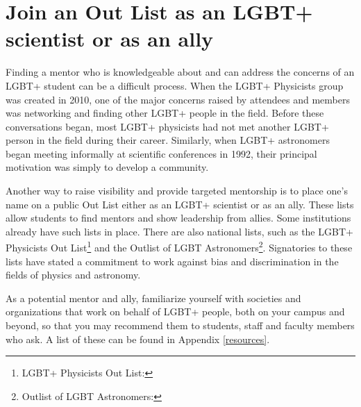 \section {Join an Out List as an LGBT+ scientist or as an ally}
\label{outlist}
Finding a mentor who is knowledgeable about and can address the concerns of an LGBT+ student can be a difficult process. When the LGBT+ Physicists group was created in 2010, one of the major concerns raised by attendees and members was networking and finding other LGBT+ people in the field. Before these conversations began, most LGBT+ physicists had not met another LGBT+ person in the field during their career.  Similarly, when LGBT+ astronomers began meeting informally at scientific conferences in 1992, their principal motivation was simply to develop a community.

Another way to raise visibility and provide targeted mentorship is to place one's name on a public Out List either as an LGBT+ scientist or as an ally. These lists allow students to find mentors and show leadership from allies. Some institutions already have such lists in place. There are also national lists, such as the LGBT+ Physicists Out List\footnote{LGBT+ Physicists Out List:  } and the Outlist of LGBT Astronomers\footnote{Outlist of LGBT Astronomers:  }. Signatories to these lists have stated a commitment to work against bias and discrimination in the fields of physics and astronomy.

As a potential mentor and ally, familiarize yourself with societies and organizations that work on behalf of LGBT+ people, both on your campus and beyond, so that you may recommend them to students, staff and faculty members who ask.  A list of these can be found in Appendix \ref{resources}.

